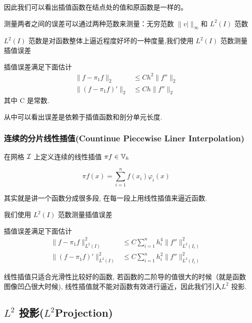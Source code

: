 \documentclass{article}
\begin{document}
因此我们可以看出插值函数在结点处的值和原函数是一样的。

测量两者之间的误差可以通过两种范数来测量：无穷范数 $\|v|\|_{ \infty } $和 $L^2(I)$ 范数

$L^2(I)$ 范数是对函数整体上逼近程度好坏的一种度量,我们使用 $L^2(I)$ 范数测量插值误差

\begin{proposition}\label{２}
    插值误差满足下面估计
    \begin{align*}
        \|f- \pi_1 f\|_2 &\leq C h^2 \|f''\|_2 \\
        \|(f - \pi_1 f)'\|_2 &\leq  C h \|f''\|_2 
    \end{align*}
    其中 C 是常数.
\end{proposition}

从中可以看出误差是依赖于插值函数和剖分单元长度.

\subsubsection{连续的分片线性插值(Countinue Piecewise Liner Interpolation)}

在网格 ${\mathcal I}$ 上定义连续的线性插值 $\pi f \in {\mathbb V}_h$ 

\begin{equation}
    \pi f(x) = \sum_{i=1}^{n} f(x_i) \varphi_i(x)
\end{equation}

其实就是讲一个函数分成很多段, 在每一段上用线性插值来逼近函数.

我们使用 $L^2(I)$ 范数测量插值误差

\begin{proposition}
    插值误差满足下面估计
    \begin{align*}
        \|f- \pi_1 f\|^2_{L^2(I)} &\leq 
        C \sum_{i=1}^n h_i^4 \|f''\|^2_{L^2(I_i)} \\
        \|(f - \pi_1 f)'\|^2_{L^2(I)} &\leq
        C \sum_{i=1}^n h_i^2 \|f''\|^2_{L^2(I_i)} 
    \end{align*}
\end{proposition}

线性插值只适合光滑性比较好的函数, 若函数的二阶导的值很大的时候（就是函数图像凹凸很大时候),
线性插值就不能对函数有效进行逼近，因此我们引入$L^2$ 投影.

\subsection{$L^2$ 投影($L^2$Projection)}
\end{document}
